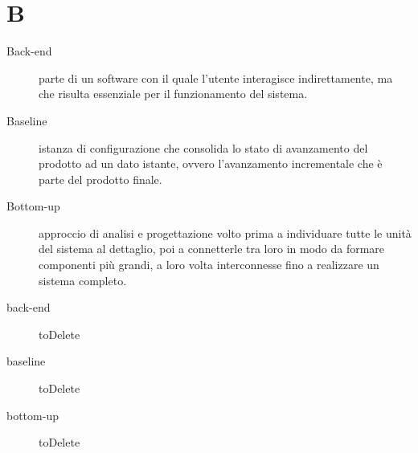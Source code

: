 \documentclass{article}
\begin{document}
  \section{B}
  \begin{description}
    \item[Back-end] parte di un software con il quale l'utente interagisce indirettamente, ma che risulta essenziale per il funzionamento del sistema.
    \item[Baseline] istanza di configurazione che consolida lo stato di avanzamento del prodotto ad un dato istante, ovvero l'avanzamento incrementale che è parte del prodotto finale.
    \item[Bottom-up] approccio di analisi e progettazione volto prima a individuare tutte le unità del sistema al dettaglio, poi a connetterle tra loro in modo da formare componenti più grandi, a loro volta interconnesse fino a realizzare un sistema completo.
    \item[back-end] toDelete
    \item[baseline] toDelete
    \item[bottom-up] toDelete
	\end{description}
\end{document}
